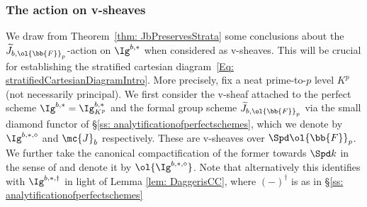 \documentclass[letterpaper,11pt]{amsart}
\begin{document}
\subsubsection{The action on v-sheaves}\label{sec: JbActionV}
We draw from Theorem~\ref{thm: JbPreservesStrata} some conclusions about the $\widetilde{J}_{b,\ol{\bb{F}}_{p}}$-action on $\Ig^{b,\ast}$ when considered as v-sheaves. This will be crucial for establishing the stratified cartesian diagram~\eqref{Eq: stratifiedCartesianDiagramIntro}. More precisely, fix a neat prime-to-$p$ level $K^p$ (not necessarily principal). We first consider the v-sheaf attached to the perfect scheme $\Ig^{b,\ast}=\Ig^{b,\ast}_{K^p}$ and the formal group scheme $\widetilde{J}_{b,\ol{\bb{F}}_{p}}$ via the small diamond functor of \S \ref{ss: analytificationofperfectschemes}, which we denote by $\Ig^{b,\ast,\diamond}$ and $\mc{J}_b$ respectively. These are v-sheaves over $\Spd \ol{\bb{F}}_{p}$. We further take the canonical compactification of the former towards $\Spd k$ in the sense of \cite[Proposition~18.6]{Ecod} and denote it by $\ol{\Ig^{b,\ast,\diamond}}$. Note that alternatively this identifies with $\Ig^{b,\ast,\dagger}$ in light of Lemma \ref{lem: DaggerisCC}, where $(-)^{\dagger}$ is as in \S  \ref{ss: analytificationofperfectschemes}
\end{document}
